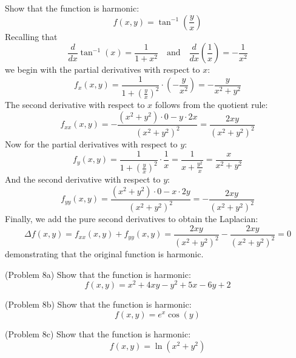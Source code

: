 \documentclass[handout]{ximera}
\begin{document}
\begin{example}[Example 8]
Show that the function is harmonic:
\[
f(x,y) = \tan^{-1}\left(\frac{y}{x}\right)
\]
Recalling that 
\[
\frac{d}{dx}\tan^{-1}(x) = \frac{1}{1+x^2} \quad \text{and} \quad \frac{d}{dx} \left(\frac{1}{x}\right) = -\frac{1}{x^2}
\]
we begin with the partial derivatives with respect to $x$:
\[
f_x(x,y) = \frac{1}{1+\left(\frac{y}{x}\right)^2} \cdot \left(-\frac{y}{x^2}\right) = -\frac{y}{x^2 + y^2}
\]
The second derivative with respect to $x$ follows from the quotient rule:
\[
f_{xx}(x,y) = -\frac{(x^2 + y^2) \cdot 0 - y \cdot 2x}{(x^2 + y^2)^2} = \frac{2xy}{(x^2 + y^2)^2}
\]
Now for the partial derivatives with respect to $y$:
\[
f_y(x,y) = \frac{1}{1+\left(\frac{y}{x}\right)^2} \cdot \frac{1}{x} = \frac{1}{x + \frac{y^2}{x}} = \frac{x}{x^2 + y^2}
\]
And the second derivative with respect to $y$:
\[
f_{yy}(x,y) = \frac{(x^2+y^2)\cdot 0 - x \cdot 2y}{(x^2 + y^2)^2} = -\frac{2xy}{(x^2 + y^2)^2}
\]
Finally, we add the pure second derivatives to obtain the Laplacian:
\[
\Delta f(x,y) = f_{xx}(x,y) + f_{yy}(x,y) = \frac{2xy}{(x^2 + y^2)^2}-\frac{2xy}{(x^2 + y^2)^2} =0
\]
demonstrating that the original function is harmonic.
\end{example}

\begin{problem}(Problem 8a)
Show that the function is harmonic:
\[
f(x,y) = x^2 + 4xy - y^2 + 5x - 6y +2
\]

\end{problem}

\begin{problem}(Problem 8b)
Show that the function is harmonic:
\[
f(x,y) = e^x \cos(y)
\]

\end{problem}

\begin{problem}(Problem 8c)
Show that the function is harmonic:
\[
f(x,y) = \ln(x^2 + y^2)
\]

\end{problem}
\end{document}

